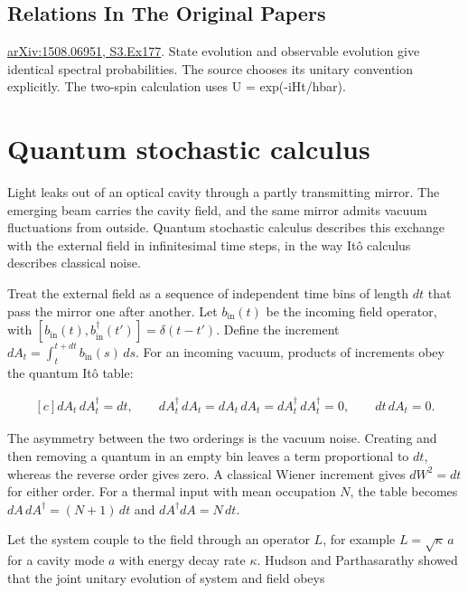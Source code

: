 \documentclass[11pt,oneside]{book}
\newenvironment{centeredalign}{\[\begin{gathered}[c]}{\end{gathered}\]}
\begin{document}
\subsection*{Relations In The Original Papers}

\href{https://arxiv.org/html/1508.06951#S3.Ex177}{arXiv:1508.06951, S3.Ex177}. State evolution and observable evolution give identical spectral probabilities. The source chooses its unitary convention explicitly. The two-spin calculation uses U = exp(-iHt/hbar).



\clearpage

\section{Quantum stochastic calculus}

\label{topic:quantum-stochastic-calculus}

Light leaks out of an optical cavity through a partly transmitting mirror. The emerging beam carries the cavity field, and the same mirror admits vacuum fluctuations from outside. Quantum stochastic calculus describes this exchange with the external field in infinitesimal time steps, in the way Itô calculus describes classical noise.

Treat the external field as a sequence of independent time bins of length \(dt\) that pass the mirror one after another. Let \(b_{\mathrm{in}}(t)\) be the incoming field operator, with \([b_{\mathrm{in}}(t),b_{\mathrm{in}}^\dagger(t')]=\delta(t-t')\). Define the increment \(dA_t=\int_t^{t+dt}b_{\mathrm{in}}(s)\,ds\). For an incoming vacuum, products of increments obey the quantum Itô table:

\begin{centeredalign}
dA_t\,dA_t^\dagger=dt,\qquad dA_t^\dagger\,dA_t=dA_t\,dA_t=dA_t^\dagger\,dA_t^\dagger=0,
\qquad dt\,dA_t=0.
\end{centeredalign}

The asymmetry between the two orderings is the vacuum noise. Creating and then removing a quantum in an empty bin leaves a term proportional to \(dt\), whereas the reverse order gives zero. A classical Wiener increment gives \(dW^2=dt\) for either order. For a thermal input with mean occupation \(N\), the table becomes \(dA\,dA^\dagger=(N+1)\,dt\) and \(dA^\dagger dA=N\,dt\).

Let the system couple to the field through an operator \(L\), for example \(L=\sqrt\kappa\,a\) for a cavity mode \(a\) with energy decay rate \(\kappa\). Hudson and Parthasarathy showed that the joint unitary evolution of system and field obeys
\end{document}

